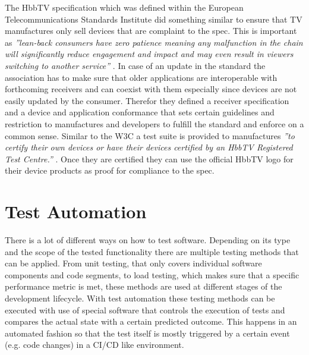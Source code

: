 The HbbTV specification which was defined within the European Telecommunications Standards
Institute did something similar to ensure that TV manufactures only sell devices that are
complaint to the spec. This is important as \textit{''lean-back consumers have zero patience
meaning any malfunction in the chain will significantly reduce engagement and impact and
may even result in viewers switching to another service''} \cite{hbbtvtesting}. In case of
an update in the standard the association has to make sure that older applications are
interoperable with forthcoming receivers and can coexist with them especially since devices
are not easily updated by the consumer. Therefor they defined a receiver specification and
a device and application conformance that sets certain guidelines and restriction to manufactures
and developers to fulfill the standard and enforce on a common sense. Similar to the W3C a
test suite is provided to manufactures \textit{''to certify their own devices or have their
devices certified by an HbbTV Registered Test Centre.''} \cite{hbbtvtesting}. Once they are
certified they can use the official HbbTV logo for their device products as proof for compliance
to the spec.

\section{Test Automation\label{sec:testautomation}}

There is a lot of different ways on how to test software. Depending on its type and the scope of
the tested functionality there are multiple testing methods that can be applied. From unit testing,
that only covers individual software components and code segments, to load testing, which makes sure
that a specific performance metric is met, these methods are used at different stages of the
development lifecycle. With test automation these testing methods can be executed with use of
special software that controls the execution of tests and compares the actual state with a
certain predicted outcome. This happens in an automated fashion so that the test itself is mostly
triggered by a certain event (e.g. code changes) in a CI/CD like environment.

